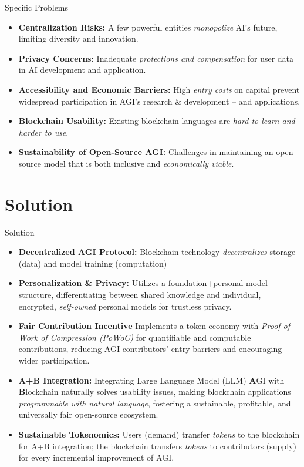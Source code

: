 \documentclass{beamer}
\begin{document}
\begin{frame}{Specific Problems}
\begin{itemize}
    \item \textbf{Centralization Risks: } A few powerful entities \emph{monopolize} AI's future, limiting diversity and innovation.
	\item \textbf{Privacy Concerns: } Inadequate \emph{protections and compensation} for user data in AI development and application.
	\item \textbf{Accessibility and Economic Barriers: } High \emph{entry costs} on capital prevent widespread participation in AGI's research \& development -- and applications.
	\item \textbf{Blockchain Usability: } Existing blockchain languages are \emph{hard to learn and harder to use}.
	\item \textbf{Sustainability of Open-Source AGI: } Challenges in maintaining an open-source model that is both inclusive and \emph{economically viable}.
\end{itemize}
\end{frame}

\section{Solution}
\begin{frame}{Solution}
\begin{itemize}
    \item \textbf{Decentralized AGI Protocol: } {\footnotesize Blockchain technology \emph{decentralizes} storage (data) and model training (computation)}
    \item \textbf{Personalization \& Privacy: } {\footnotesize Utilizes a foundation+personal model structure, differentiating between shared knowledge and individual, encrypted, \emph{self-owned} personal models for trustless privacy.}
    \item \textbf{Fair Contribution Incentive} {\footnotesize Implements a token economy with \emph{Proof of Work of Compression (PoWoC)} for quantifiable and computable contributions, reducing AGI contributors' entry barriers and encouraging wider participation.}
    \item \textbf{A+B Integration: } {\footnotesize Integrating Large Language Model (LLM) \textbf{A}GI with \textbf{B}lockchain naturally solves usability issues, making blockchain applications \emph{programmable with natural language}, fostering a sustainable, profitable, and universally fair open-source ecosystem.}
    \item \textbf{Sustainable Tokenomics: } {\footnotesize Users (demand) transfer \emph{tokens} to the blockchain for A+B integration; the blockchain transfers \emph{tokens} to contributors (supply) for every incremental improvement of AGI.}
\end{itemize}
\end{frame}
\end{document}
